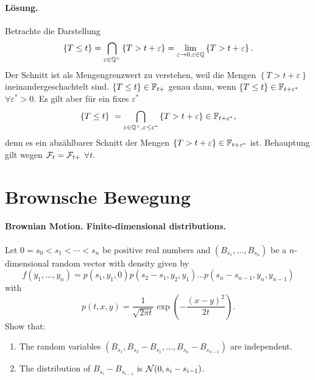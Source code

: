 \paragraph*{Lösung.}  Betrachte die Darstellung
\begin{eqnarray}
    \left\{ T \leq t \right\} = \bigcap_{\varepsilon\in\mathbb Q^{+}} \left\{ T > t+\varepsilon \right\}
    = \lim_{\varepsilon\to 0, \varepsilon\in\mathbb Q} \left\{ T > t+\varepsilon \right\}.
\end{eqnarray}
Der Schnitt ist als Mengengrenzwert zu verstehen, weil die Mengen $\left\{ T >
t+\varepsilon \right\}$ ineinandergeschachtelt sind. $\left\{ T \leq t \right\}\in \mathbb F_{t+}$
genau dann, wenn $\left\{ T \leq t \right\}\in \mathbb F_{t+\varepsilon^{*}}$ $\forall \varepsilon^{*}>0$.
Es gilt aber für ein fixes $\varepsilon^{*}$
\begin{equation}
    \left\{ T \leq t \right\}\ = 
    \bigcap_{\varepsilon\in\mathbb Q^{+}, \varepsilon\leq \varepsilon^{*}} \left\{ T > t+\varepsilon \right\} 
    \in\mathbb F_{t+\varepsilon^{*}},
\end{equation}
denn es ein abzählbarer Schnitt der Mengen $\left\{ T> t+\varepsilon
\right\}\in\mathbb F_{t+\varepsilon^{*}}$ ist. Behauptung gilt wegen $\mathcal F_t=\mathcal F_{t+}$ $\forall t$.


\section{Brownsche Bewegung}

\paragraph{Brownian Motion. Finite-dimensional distributions. } 
Let $0=s_0 < s_1 < \cdots < s_n$ be positive real numbers and $(B_{s_{1}},\dots ,B_{s_n})$ 
be a $n$-dimensional random vector with density given by
\begin{equation*}
    f(y_1,\dots ,y_n) = p(s_1, y_1, 0)p(s_2-s_1,y_2, y_1)\dots p(s_n-s_{n-1}, y_n, y_{n-1})
\end{equation*}
with 
\begin{equation*}
    p(t, x,y ) = \frac{1}{\sqrt{2\pi t}} \exp(-\frac{(x-y)^2}{2t}). 
\end{equation*}
Show that:
\begin{enumerate}
    \item The random variables $(B_{s_1}, B_{s_2}-B_{s_1},\dots ,B_{s_n}-B_{s_{n-1}})$ 
        are independent.
    \item The distribution of $B_{s_i}-B_{s_{i-1}}$ is $\mathcal N(0, s_{i}-s_{i-1})$.
\end{enumerate}

